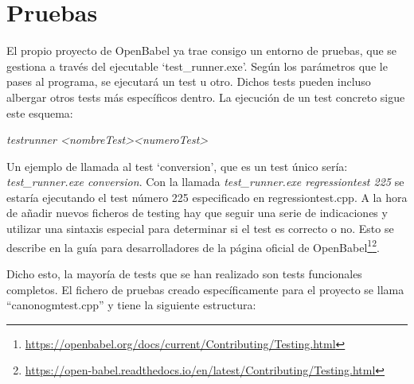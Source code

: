 \begin{longtable}{c>{\centering}m{5cm}>{\centering\arraybackslash}m{5.9cm}}
    
    \label{tab:alias_vs_no_alias}
\end{longtable}



\newpage



\section{Pruebas} \label{pruebas}
El propio proyecto de OpenBabel ya trae consigo un entorno de pruebas, que se gestiona a través del ejecutable `test\_runner.exe'. Según los parámetros que le pases al programa, se ejecutará un test u otro. Dichos tests pueden incluso albergar otros tests más específicos dentro. La ejecución de un test concreto sigue este esquema: 
\begin{center}
    \textit{test\textunderscore runner \textless nombreTest\textgreater  \textless numeroTest\textgreater}    
\end{center}

Un ejemplo de llamada al test `conversion', que es un test único sería: \textit{test\_runner.exe conversion}. Con la llamada \textit{test\_runner.exe regressiontest 225} se estaría ejecutando el test número 225 especificado en regressiontest.cpp. A la hora de añadir nuevos ficheros de testing hay que seguir una serie de indicaciones y utilizar una sintaxis especial para determinar si el test es correcto o no. Esto se describe en la guía para desarrolladores de la página oficial de OpenBabel\footnote{\url{https://openbabel.org/docs/current/Contributing/Testing.html}}\footnotecomma\footnote{\url{https://open-babel.readthedocs.io/en/latest/Contributing/Testing.html}}.

Dicho esto, la mayoría de tests que se han realizado son tests funcionales completos. El fichero de pruebas creado específicamente para el proyecto se llama ``canonogmtest.cpp'' y tiene la siguiente estructura:
\vspace{0.2cm}

